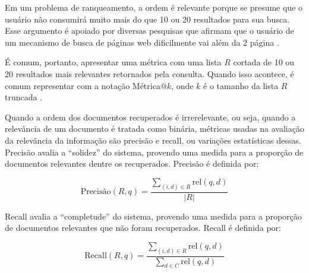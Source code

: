 \documentclass[
	12pt,				%
	openright,			%
	oneside,			%
	a4paper,			%
	english,			%
	french,				%
	spanish,			%
	brazil				%
	]{abntex2}
\begin{document}
Em um problema de ranqueamento, a ordem é relevante porque se presume que o usuário não consumirá muito mais do que
10 ou 20 resultados para sua busca.
Esse argumento é apoiado por diversas pesquisas que afirmam que o usuário de um mecanismo de busca de páginas web dificilmente vai além da 2 página \cite{biblia}.

É comum, portanto, apresentar uma métrica com uma lista $R$ cortada de 10 ou 20 resultados mais relevantes retornados pela consulta.
Quando isso acontece, é comum representar com a notação Métrica@$k$, onde $k$ é o tamanho da lista $R$ truncada \cite{biblia}.

Quando a ordem dos documentos recuperados é irrerelevante,
ou seja, quando a relevância de um documento é tratada como binária,
métricas usadas na avaliação da relevância da
informação são precisão e recall, ou variações estatísticas dessas.
Precisão avalia a ``solidez'' do sistema, provendo uma medida para a proporção de documentos relevantes dentre os
recuperados. Precisão é definida por:

\begin{equation}
    \text{Precisão}(R,q) = \frac{\sum_{(i,d)\in R} \text{rel}(q,d)}{|R|}
\end{equation}

Recall avalia a ``completude'' do sistema, provendo uma medida para a proporção de documentos relevantes que não
foram recuperados. Recall é definida por:

\begin{equation}
    \text{Recall}(R,q) = \frac{\sum_{(i,d)\in R} \text{rel}(q,d)}{\sum_{d\in C} \text{rel}(q,d)}
\end{equation}

\end{document}

